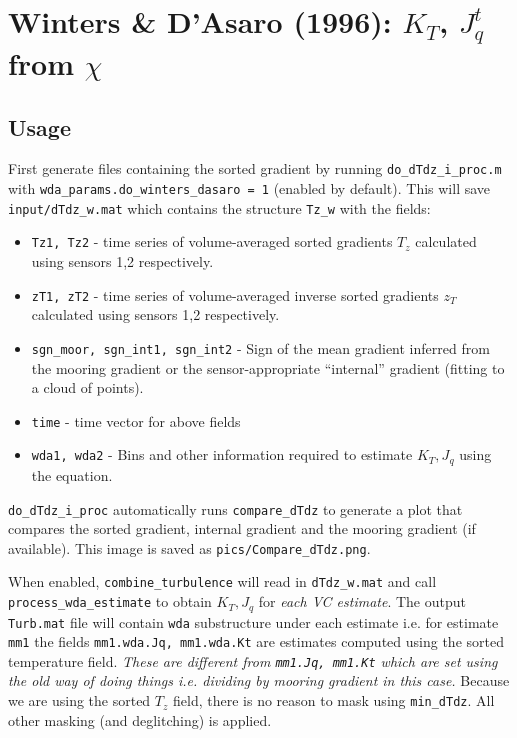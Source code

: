 \chapter{Winters \& D'Asaro (1996): $K_T$, $J_q^t$ from $χ$}

\section{Usage}

First generate files containing the sorted gradient by running \texttt{do\_dTdz\_i\_proc.m} with \texttt{wda\_params.do\_winters\_dasaro = 1} (enabled by default).
This will save \texttt{input/dTdz\_w.mat} which contains the structure \texttt{Tz\_w} with the fields:
\begin{itemize}
\item \texttt{Tz1, Tz2} - time series of volume-averaged sorted gradients $T_z$ calculated using sensors 1,2 respectively.
\item \texttt{zT1, zT2} - time series of volume-averaged inverse sorted gradients $z_T$ calculated using sensors 1,2 respectively.
\item \texttt{sgn\_moor, sgn\_int1, sgn\_int2} - Sign of the mean gradient inferred from the mooring gradient or the sensor-appropriate ``internal'' gradient (fitting to a cloud of points).
\item \texttt{time} - time vector for above fields
\item \texttt{wda1, wda2} - Bins and other information required to estimate $K_T, J_q$ using the \cite{Winters1996} equation.
\end{itemize}

\texttt{do\_dTdz\_i\_proc} automatically runs \texttt{compare\_dTdz} to generate a plot that compares the sorted gradient, internal gradient and the mooring gradient (if available).
This image is saved as \texttt{pics/Compare\_dTdz.png}.

When enabled, \texttt{combine\_turbulence} will read in \texttt{dTdz\_w.mat} and call \texttt{process\_wda\_estimate} to obtain $K_T, J_q$ for \emph{each VC estimate}.
The output \texttt{Turb.mat} file will contain \texttt{wda} substructure under each estimate i.e. for estimate \texttt{mm1} the fields \texttt{mm1.wda.Jq, mm1.wda.Kt} are estimates computed using the sorted temperature field. \emph{These are different from \texttt{mm1.Jq, mm1.Kt} which are set using the old way of doing things i.e. dividing by mooring gradient in this case.}
Because we are using the sorted $T_z$ field, there is no reason to mask using \texttt{min\_dTdz}.
All other masking (and deglitching) is applied.


